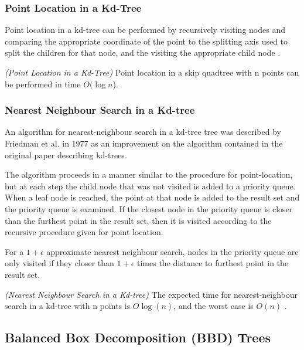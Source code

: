 \documentclass[mcs]{scsthesis}
\begin{document}
\subsubsection{Point Location in a Kd-Tree}

Point location in a kd-tree can be performed by recursively visiting nodes and
comparing the appropriate coordinate of the point to the splitting axis used
to split the children for that node, and the visiting the appropriate child
node \cite{kdtree}.

\begin{thm} \emph{(Point Location in a Kd-Tree)} 
Point location in a skip quadtree with n points can be performed in time
\(O(\log n\)). 
\end{thm}

\subsubsection{Nearest Neighbour Search in a Kd-tree}

An algorithm for nearest-neighbour search in a kd-tree tree was described
by Friedman et al. \cite{friedman} in 1977 as an improvement on the algorithm
contained in the original paper describing kd-trees.

The algorithm proceeds in a manner similar to the procedure for point-location,
but at each step the child node that was not visited is added to a priority
queue. When a leaf node is reached, the point at that node is added to the
result set and the priority queue is examined. If the closest node in the
priority queue is closer than the furthest point in the result set, then it
is visited according to the recursive procedure given for point location. 

For a \(1 + \epsilon\) approximate nearest neighbour search, nodes in the
priority queue are only visited if they closer than \(1 + \epsilon\) times
the distance to furthest point in the result set.

\begin{thm} \emph{(Nearest Neighbour Search in a Kd-tree)} 
The expected time for nearest-neighbour search in a kd-tree with n points is
\(O \log(n)\), and the worst case is \(O(n)\) \cite{friedman}.
\end{thm}

\subsection{Balanced Box Decomposition (BBD) Trees}
\end{document}
